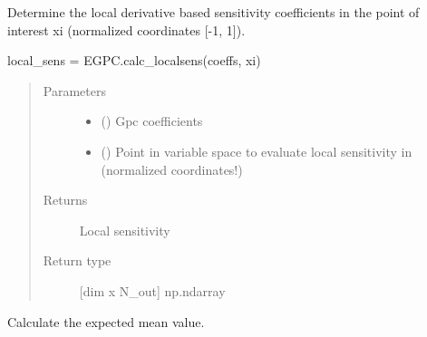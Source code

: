 \documentclass[letterpaper,10pt,english,openany,oneside]{sphinxmanual}
\begin{document}
\begin{fulllineitems}
\begin{fulllineitems}
\label{\detokenize{pygpc:pygpc.EGPC.EGPC.get_local_sens}}
Determine the local derivative based sensitivity coefficients in the point of interest xi
(normalized coordinates {[}-1, 1{]}).

local\_sens = EGPC.calc\_localsens(coeffs, xi)
\begin{quote}\begin{description}
\item[{Parameters}] \leavevmode\begin{itemize}
\item {} 
 (\sphinxstyleliteralemphasis{\sphinxupquote{{[}}}\sphinxstyleliteralemphasis{\sphinxupquote{{]} }}) \textendash{} Gpc coefficients

\item {} 
 (\sphinxstyleliteralemphasis{\sphinxupquote{{[}}}\sphinxstyleliteralemphasis{\sphinxupquote{{]} }}) \textendash{} Point in variable space to evaluate local sensitivity in (normalized coordinates!)

\end{itemize}

\item[{Returns}] \leavevmode
{} \textendash{} Local sensitivity

\item[{Return type}] \leavevmode
{[}dim x N\_out{]} np.ndarray

\end{description}\end{quote}

\end{fulllineitems}


\begin{fulllineitems}
\label{\detokenize{pygpc:pygpc.EGPC.EGPC.get_mean}}
Calculate the expected mean value.


\end{fulllineitems}
\end{fulllineitems}
\end{document}
